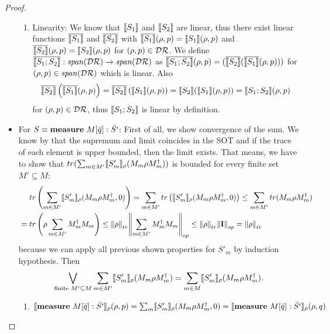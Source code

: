 \documentclass[a4paper,UKenglish,cleveref, autoref, thm-restate]{lipics-v2021}
\begin{document}
\begin{proof}
\begin{itemize}
\begin{enumerate}
            \item Linearity:
            We know that $\llbracket S_1 \rrbracket$ and $\llbracket S_2 \rrbracket$ are linear, thus there exist linear functions $\overline{\llbracket S_1 \rrbracket}$ and $\overline{\llbracket S_2 \rrbracket}$ with $\overline{\llbracket S_1 \rrbracket}(\rho,p) = \llbracket S_1 \rrbracket(\rho,p)$ and $\overline{\llbracket S_2 \rrbracket}(\rho,p) = \llbracket S_2 \rrbracket(\rho,p)$ for $(\rho,p)\in \mathcal{D}\mathcal{R}$. We define $\overline{\llbracket S_1;S_2 \rrbracket}: \mathit{span}(\mathcal{D}\mathcal{R}) \to \mathit{span}(\mathcal{D}\mathcal{R})$ as $\overline{\llbracket S_1;S_2 \rrbracket}(\rho,p) = (\overline{\llbracket S_2 \rrbracket}(\overline{\llbracket S_1 \rrbracket}(\rho,p)))$ for $(\rho,p) \in \mathit{span}(\mathcal{D}\mathcal{R})$ which is linear. Also
            \begin{align*}
                \overline{\llbracket S_2 \rrbracket}\left(\overline{\llbracket S_1 \rrbracket}(\rho,p)\right) = \overline{\llbracket S_2 \rrbracket}\left(\llbracket S_1 \rrbracket(\rho,p)\right) = \llbracket S_2 \rrbracket(\llbracket S_1 \rrbracket(\rho,p)) = \llbracket S_1;S_2 \rrbracket(\rho,p)
            \end{align*}
            for $(\rho,p) \in \mathcal{D}\mathcal{R}$, thus $\llbracket S_1;S_2 \rrbracket$ is linear by definition.
        \end{enumerate}
        \item For $S \equiv \mathbf{measure } \text{ }M[\Bar{q}]:\Bar{S'}$:
        First of all, we show convergence of the sum.
        We know by \cite[Lem. 30]{heisenbergdualityUnruh} that the supremum and limit coincides in the SOT and if the trace of each element is upper bounded, then the limit exists. That means, we have to show that $tr(\sum_{m \in M'} \llbracket S'_m \rrbracket_{\rho}(M_m \rho M_m^\dagger))$ is bounded for every finite set $M'\subseteq M$:
        \begin{align*}
            &\phantom{=.}tr\left(\sum_{m \in M'} \llbracket S'_m \rrbracket_{\rho}(M_m \rho M_m^\dagger,0)\right) = \sum_{m \in M'}tr\left( \llbracket S'_m \rrbracket_{\rho}(M_m \rho M_m^\dagger,0)\right) \leq \sum_{m \in M'}tr( M_m \rho M_m^\dagger) \\
            &= tr\left(\rho \sum_{m \in M'} M_m^\dagger M_m\right) \leq \norm{\rho}_{tr} \norm{\sum_{m \in M'} M_m^\dagger M_m}_{op} \leq \norm{\rho}_{tr} \norm{\textbf{I}}_{op} = \norm{\rho}_{tr}
        \end{align*}
        because we can apply all previous shown properties for $S'_m$ by induction hypothesis.
        Then \begin{align*}
            \bigvee_{\text{finite }M' \subseteq M} \sum_{m \in M'} \llbracket S'_m \rrbracket_{\rho}(M_m \rho M_m^\dagger) = \sum_{m \in M} \llbracket S'_m \rrbracket_{\rho}(M_m \rho M_m^\dagger).
        \end{align*}
        \begin{enumerate}
            \item $\llbracket \mathbf{measure } \text{ }M[\Bar{q}]:\Bar{S'} \rrbracket_{\rho}(\rho,p) = \sum_m \llbracket S'_m \rrbracket_{\rho}(M_m \rho M_m ^\dagger ,0) = \llbracket \mathbf{measure } \text{ }M[\Bar{q}]:\Bar{S'} \rrbracket_{\rho}(\rho,q)$


\end{enumerate}
\end{itemize}
\end{proof}
\end{document}
